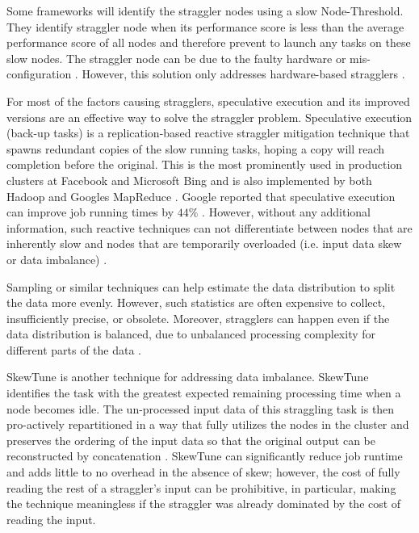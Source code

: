 Some frameworks will identify the straggler nodes using a slow Node-Threshold. 
They identify straggler node when its performance score is less than the average performance score of all nodes and therefore prevent to launch any tasks on these slow nodes. 
The straggler node can be due to the faulty hardware or mis-configuration \cite{Dean2004}. 
However, this solution only addresses hardware-based stragglers \cite{Chen2014}.

For most of the factors causing stragglers, speculative execution and its improved versions are an effective way to solve the straggler problem. 
Speculative execution (back-up tasks) is a replication-based reactive straggler mitigation technique that spawns redundant copies of the slow running tasks, hoping a copy will reach completion before the original. 
This is the most prominently used in production clusters at Facebook and Microsoft Bing and is also implemented by both Hadoop and Google\textsc{}s MapReduce \cite{Dean2004}.
Google reported that speculative execution can improve job running times by $44\%$ \cite{Dean2004}.
However, without any additional information, such reactive techniques can not differentiate between nodes that are inherently slow and nodes that are temporarily overloaded (i.e. input data skew or data imbalance) \cite{Chen2014, Bhandare2016}.

Sampling or similar techniques can help estimate the data distribution to split the data more evenly. 
However, such statistics are often expensive to collect, insufficiently precise, or obsolete. 
Moreover, stragglers can happen even if the data distribution is balanced, due to unbalanced processing complexity for different parts of the data \cite{Khoshlessan:2017ab}.

SkewTune is another technique for addressing data imbalance. 
SkewTune identifies the task with the greatest expected remaining processing time when a node becomes idle. 
The un-processed input data of this straggling task is then pro-actively repartitioned in a way that fully utilizes the nodes in the cluster and preserves 
the ordering of the input data so that the original output can be reconstructed by concatenation \cite{Kwon2012}. 
SkewTune can significantly reduce job runtime and adds little to no overhead in the absence of skew; however, the cost of fully reading the rest of a straggler's input can be prohibitive, in particular, making 
the technique meaningless if the straggler was already dominated by the cost of reading the input.

